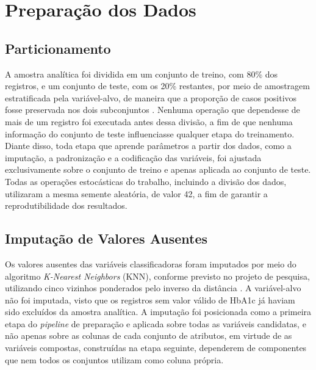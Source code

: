 \section{Preparação dos Dados}\label{sec:preparacao}

\subsection{Particionamento}\label{sec:particionamento}
A amostra analítica foi dividida em um conjunto de treino, com 80\% dos registros, e um conjunto de teste, com os 20\% restantes, por meio de amostragem estratificada pela variável-alvo, de maneira que a proporção de casos positivos fosse preservada nos dois subconjuntos \cite{pedregosa2011scikit}. Nenhuma operação que dependesse de mais de um registro foi executada antes dessa divisão, a fim de que nenhuma informação do conjunto de teste influenciasse qualquer etapa do treinamento. Diante disso, toda etapa que aprende parâmetros a partir dos dados, como a imputação, a padronização e a codificação das variáveis, foi ajustada exclusivamente sobre o conjunto de treino e apenas aplicada ao conjunto de teste. Todas as operações estocásticas do trabalho, incluindo a divisão dos dados, utilizaram a mesma semente aleatória, de valor 42, a fim de garantir a reprodutibilidade dos resultados.

\subsection{Imputação de Valores Ausentes}\label{sec:imputacao}
Os valores ausentes das variáveis classificadoras foram imputados por meio do algoritmo \textit{K-Nearest Neighbors} (KNN), conforme previsto no projeto de pesquisa, utilizando cinco vizinhos ponderados pelo inverso da distância \cite{pedregosa2011scikit}. A variável-alvo não foi imputada, visto que os registros sem valor válido de HbA1c já haviam sido excluídos da amostra analítica. A imputação foi posicionada como a primeira etapa do \textit{pipeline} de preparação e aplicada sobre todas as variáveis candidatas, e não apenas sobre as colunas de cada conjunto de atributos, em virtude de as variáveis compostas, construídas na etapa seguinte, dependerem de componentes que nem todos os conjuntos utilizam como coluna própria.


